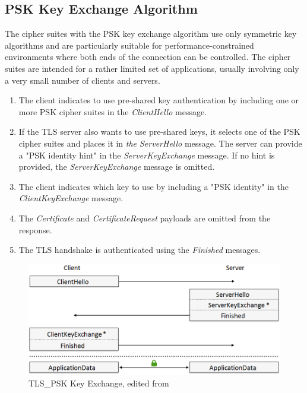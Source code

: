 \documentclass[
  twoside, 12pt, 
  printed, %
  notable,   %
  lof,     %
  lot,     %
]{fithesis3}
\begin{document}
\subsection{PSK Key Exchange Algorithm}\label{pskAlgorithm}
The cipher suites with the PSK key exchange algorithm use only symmetric key algorithms and 
are particularly suitable for performance-constrained environments where both ends of the 
connection can be controlled. The cipher suites are intended for a rather limited set of 
applications, usually involving only a very small number of clients and servers.

\begin{enumerate}
\item The client indicates to use pre-shared key authentication by including one or more PSK cipher suites in the \textit{ClientHello} message. 
\item If the TLS server also wants to use pre-shared keys, it selects one of the PSK cipher suites and places it in \textit{the ServerHello} message. The server can provide a "PSK identity hint" in the \textit{ServerKeyExchange} message. If no hint is provided, the \textit{ServerKeyExchange} message is omitted.
\item The client indicates which key to use by including a "PSK identity" in the \textit{ClientKeyExchange} message.
\item The \textit{Certificate} and \textit{CertificateRequest} payloads are omitted from the response.
\item The TLS handshake is authenticated using the \textit{Finished} messages. 
\end{enumerate}

\begin{figure}[th]
	\centering
  	\includegraphics[width=1.05\textwidth]{psk-edited}%
   \caption{TLS\_PSK Key Exchange, edited from \cite{taubert}}
\end{figure}
\end{document}
